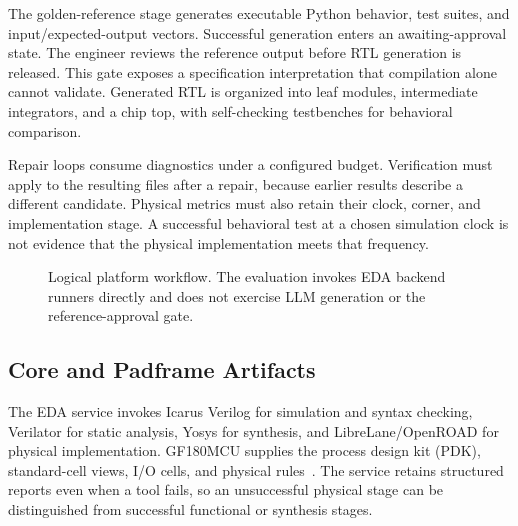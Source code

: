 \documentclass[conference,letterpaper]{IEEEtran}
\begin{document}
The golden-reference stage generates executable Python behavior, test suites, and input/expected-output vectors. Successful generation enters an awaiting-approval state. The engineer reviews the reference output before RTL generation is released. This gate exposes a specification interpretation that compilation alone cannot validate. Generated RTL is organized into leaf modules, intermediate integrators, and a chip top, with self-checking testbenches for behavioral comparison.

Repair loops consume diagnostics under a configured budget. Verification must apply to the resulting files after a repair, because earlier results describe a different candidate. Physical metrics must also retain their clock, corner, and implementation stage. A successful behavioral test at a chosen simulation clock is not evidence that the physical implementation meets that frequency.

\begin{figure}[t]
\centering
{}
\caption{Logical platform workflow. The evaluation invokes EDA backend runners directly and does not exercise LLM generation or the reference-approval gate.}
\label{fig:flow}
\end{figure}

\subsection{Core and Padframe Artifacts}
The EDA service invokes Icarus Verilog for simulation and syntax checking, Verilator for static analysis, Yosys for synthesis, and LibreLane/OpenROAD for physical implementation. GF180MCU supplies the process design kit (PDK), standard-cell views, I/O cells, and physical rules~\cite{gf180}. The service retains structured reports even when a tool fails, so an unsuccessful physical stage can be distinguished from successful functional or synthesis stages.
\end{document}
